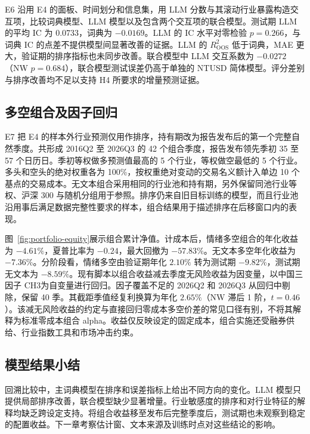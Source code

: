 E6 沿用 E4 的面板、时间划分和信息集，用 LLM 分数与其滚动行业暴露构造交互项，比较词典模型、LLM 模型以及包含两个交互项的联合模型。测试期 LLM 的平均 IC 为 0.0733，词典为 $-0.0169$。LLM 的 IC 水平对零检验 $p=0.266$，与词典 IC 的点差不提供模型间显著改善的证据。LLM 的 $R^2_{\mathrm{OOS}}$ 低于词典，MAE 更大，验证期的排序指标也未同步改善。联合模型中 LLM 交互系数为 $-0.0272$（NW $p=0.684$），联合模型测试误差仍高于单独的 NTUSD 简体模型。评分差别与排序改善均不足以支持 H4 所要求的增量预测证据。

\subsection{多空组合及因子回归}

E7 把 E4 的样本外行业预测仅用作排序，持有期改为报告发布后的第一个完整自然季度。共形成 2016Q2 至 2026Q3 的 42 个组合季度，报告发布领先季初 35 至 57 个日历日。季初等权做多预测值最高的 5 个行业，等权做空最低的 5 个行业。多头和空头的绝对权重各为 100\%，按权重绝对变动的交易名义额计入单边 10 个基点的交易成本。无文本组合采用相同的行业池和持有期，另外保留同池行业等权、沪深 300 与随机分组用于参照。排序仍来自旧目标训练的模型，而且行业池沿用事后满足数据完整性要求的样本，组合结果用于描述排序在后移窗口内的表现。

图~\ref{fig:portfolio-equity}展示组合累计净值。计成本后，情绪多空组合的年化收益为 $-4.61\%$，夏普比率为 $-0.24$，最大回撤为 $-57.83\%$。无文本多空年化收益为 $-7.36\%$。分阶段看，情绪多空由验证期年化 $2.10\%$ 转为测试期 $-9.82\%$，测试期无文本为 $-8.59\%$。现有脚本以组合收益减去季度无风险收益为因变量，以中国三因子 CH3\cite{liuStambaughYuan2019}为自变量进行回归。因子覆盖不足的 2026Q2 和 2026Q3 从回归中剔除，保留 40 季。其截距季值经复利换算为年化 $2.65\%$（NW 滞后 1 阶，$t=0.46$）。该减无风险收益的约定与直接回归零成本多空价差的常见口径有别，不将其解释为标准零成本组合 alpha。收益仅反映设定的固定成本，组合实施还受融券供给、行业指数工具和市场冲击约束。


\subsection{模型结果小结}

回溯比较中，主词典模型在排序和误差指标上给出不同方向的变化。LLM 模型只提供局部排序改善，联合模型缺少显著增量。行业敏感度的排序和对行业特征的解释均缺乏跨设定支持。将组合收益移至发布后完整季度后，测试期也未观察到稳定的配置收益。下一章考察估计窗、文本来源及训练时点对这些结论的影响。

